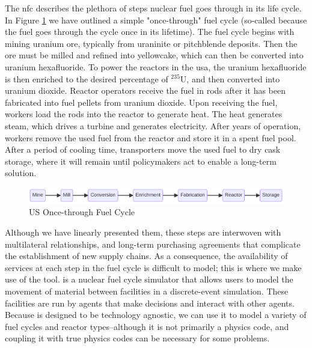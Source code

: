 The \gls{nfc} describes the plethora of steps nuclear fuel goes through
in its life cycle. In Figure \ref{fig:once-through} we have outlined a
simple "once-through" fuel cycle (so-called because the fuel goes through
the cycle once in its lifetime). The fuel cycle begins with mining uranium ore,
typically from uraninite or pitchblende deposits. Then the ore must be milled
and refined into yellowcake, which can then be converted into uranium
hexafluoride. To power the reactors in the \gls{usa}, the uranium hexafluoride
is then enriched to the desired percentage of $^{235}$U, and then converted
into uranium dioxide. Reactor operators receive the fuel in rods after it has
been fabricated into fuel pellets from uranium dioxide. Upon receiving the
fuel, workers load the rods into the reactor to generate heat. The heat
generates steam, which drives a turbine and generates electricity. After years
of operation, workers remove the used fuel from the reactor and store it in a
spent fuel pool. After a period of cooling time, transporters move the used
fuel to dry cask storage, where it will remain until policymakers act to enable
a long-term solution.

\begin{figure}[h]
    \centering
    \includegraphics[scale=0.40]{images/once_through_fc.png}
    \caption{US Once-through Fuel Cycle}
    \label{fig:once-through}
\end{figure}

Although we have linearly presented them, these steps are interwoven with
multilateral relationships, and long-term purchasing agreements that complicate
the establishment of new supply chains. As a consequence, the availability of
services at each step in the fuel cycle is difficult to model; this is where we
make use of the \cyclus \cite{huff_cyclus_intro_2016} tool. \cyclus is a
nuclear fuel cycle simulator that allows users to model the movement of
material between facilities in a discrete-event simulation. These facilities
are run by agents that make decisions and interact with other agents. Because
\cyclus is designed to be technology agnostic, we can use it to model a variety
of fuel cycles and reactor types--although it is not primarily a physics code,
and coupling it with true physics codes can be necessary for some problems.

